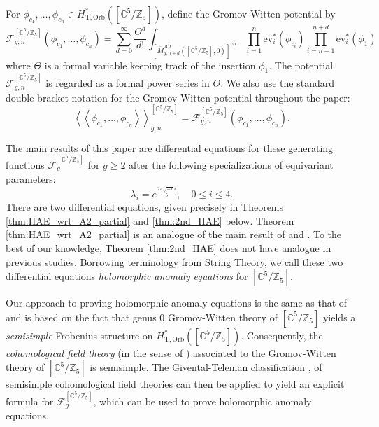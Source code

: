 \documentclass[12pt]{amsart}
\numberwithin{equation}{section}
\begin{document}
For $\phi_{c_{1}}, \ldots,\phi_{c_{n}}\in H^{*}_{\mathrm{T,Orb}}\left(\left[\mathbb{C}^5/\mathbb{Z}_5\right]\right)$, define the Gromov-Witten potential by
\begin{equation}\label{eq:GW_Potential_phi_insertions}
\mathcal{F}_{g, n}^{\left[\mathbb{C}^{5} / \mathbb{Z}_{5}\right]}\left(\phi_{c_{1}}, \ldots, \phi_{c_{n}}\right)=\sum_{d=0}^{\infty} \frac{\Theta^{d}}{d !} \int_{\left[\overline{M}_{g, n+d}^{\mathrm{orb}}\left(\left[\mathbb{C}^{5} / \mathbb{Z}_{5}\right], 0\right)\right]^{v i r}} \prod_{i=1}^{n} \mathrm{ev}_{i}^{*}\left(\phi_{c_{i}}\right) \prod_{i=n+1}^{n+d} \mathrm{ev}_{i}^{*}\left(\phi_{1}\right)
\end{equation}
where $\Theta$ is a formal variable keeping track of the insertion $\phi_1$. The potential $\mathcal{F}_{g, n}^{\left[\mathbb{C}^{5} / \mathbb{Z}_{5}\right]}$ is regarded as a formal power series in $\Theta$.
We also use the standard double bracket notation for the Gromov-Witten potential throughout the paper: 
\begin{equation*}
\left\langle\left\langle\phi_{c_{1}}, \ldots, \phi_{c_{n}}\right\rangle\right\rangle_{g, n}^{\left[\mathbb{C}^{5} / \mathbb{Z}_{5}\right]}=\mathcal{F}_{g, n}^{\left[\mathbb{C}^{5} / \mathbb{Z}_{5}\right]}\left(\phi_{c_{1}}, \ldots, \phi_{c_{n}}\right).
\end{equation*}

 
The main results of this paper are differential equations for these generating functions $\mathcal{F}^{[\mathbb{C}^5/\mathbb{Z}_5]}_{g}$ for $g\geq{2}$ after the following specializations of equivariant parameters:  
\begin{equation}\label{eqn:specialization}
   \lambda_i=e^{\frac{2\pi\sqrt{-1}i}{5}}, \quad 0\leq i \leq 4.
\end{equation}
There are two differential equations, given precisely in Theorems \ref{thm:HAE_wrt_A2_partial} and \ref{thm:2nd_HAE} below. Theorem \ref{thm:HAE_wrt_A2_partial} is an analogue of the main result of \cite{lho-p} and \cite{lho-p2}. To the best of our knowledge, Theorem \ref{thm:2nd_HAE} does not have analogue in previous studies. Borrowing terminology from String Theory, we call these two differential equations {\em holomorphic anomaly equations} for $[\mathbb{C}^5/\mathbb{Z}_5]$.

Our approach to proving holomorphic anomaly equations is the same as that of \cite{lho-p2} and is based on the fact that genus $0$ Gromov-Witten theory of $[\mathbb{C}^5/\mathbb{Z}_5]$ yields a {\em semisimple} Frobenius structure on $H^*_\mathrm{T, Orb}([\mathbb{C}^5/\mathbb{Z}_5])$. Consequently, the {\em cohomological field theory} (in the sense of \cite{km}) associated to the Gromov-Witten theory of $[\mathbb{C}^5/\mathbb{Z}_5]$ is semisimple. The Givental-Teleman classification \cite{g3}, \cite{t} of semisimple cohomological field theories can then be applied to yield an explicit formula for $\mathcal{F}^{[\mathbb{C}^5/\mathbb{Z}_5]}_{g}$, which can be used to prove holomorphic anomaly equations.
\end{document}
